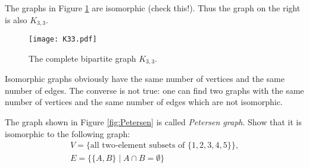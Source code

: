 \begin{page}
\setcounter{section}{1}
\setcounter{subsection}{3}
\setcounter{dfn}{4}
\label{portion:186}

\begin{exl}
The graphs in Figure \ref{fig:K33} are isomorphic (check this!).
Thus the graph on the right is also $K_{3,3}$.
\end{exl}

\end{page}

\begin{page}
\setcounter{section}{1}
\setcounter{subsection}{3}
\setcounter{dfn}{4}
\label{portion:187}


\begin{figure}[ht]
\begin{center}
\texttt{[image: K33.pdf]}
\end{center}
\caption{The complete bipartite graph $K_{3,3}$.}
\label{fig:K33}
\end{figure}


\end{page}

\begin{page}
\setcounter{section}{1}
\setcounter{subsection}{3}
\setcounter{dfn}{5}
\label{portion:189}

\begin{rem}
Isomorphic graphs obviously have the same number of vertices and the same number of edges.
The converse is not true: one can find two graphs with the same number of vertices and the same number of edges
which are not isomorphic.
\end{rem}

\end{page}

\begin{page}
\setcounter{section}{1}
\setcounter{subsection}{3}
\setcounter{dfn}{6}
\label{portion:192}

\begin{exc}
The graph shown in Figure \ref{fig:Petersen} is called \emph{Petersen graph}.
Show that it is isomorphic to the following graph:
\begin{gather*}
V = \{\text{all two-element subsets of }\{1, 2, 3, 4, 5\}\},\\
E = \{\{A, B\} \mid A \cap B = \emptyset\}
\end{gather*}
\end{exc}

\end{page}

